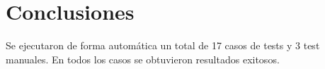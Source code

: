 \chapter{Conclusiones}\label{cap:conclusiones}

Se ejecutaron de forma automática un total de 17 casos de tests y 3 test manuales. En todos los casos se obtuvieron resultados exitosos.
